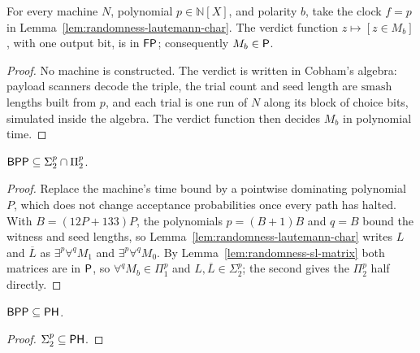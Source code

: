 \begin{lemma}
  \label{lem:randomness-sl-matrix}
  \leanok
  For every machine $N$, polynomial $p \in \mathbb{N}[X]$, and polarity $b$, take
  the clock $f = p$ in Lemma~\ref{lem:randomness-lautemann-char}. The verdict
  function $z \mapsto [z \in M_b]$, with one output bit, is in $\mathsf{FP}$;
  consequently $M_b \in \mathsf{P}$.
\end{lemma}
\begin{proof}
  \leanok
  No machine is constructed. The verdict is written in Cobham's algebra: payload
  scanners decode the triple, the trial count and seed length are
  $\mathrm{smash}$ lengths built from $p$, and each trial is one run of $N$
  along its block of choice bits, simulated inside the algebra. The verdict
  function then decides $M_b$ in polynomial time.
\end{proof}

\begin{theorem}
  \label{thm:randomness-sipser-lautemann}
  \leanok
  $\mathsf{BPP} \subseteq \Sigma^p_2 \cap \Pi^p_2$.
\end{theorem}
\begin{proof}
  \leanok
  Replace the machine's time bound by a pointwise dominating polynomial $P$,
  which does not change acceptance probabilities once every path has halted.
  With $B = (12P + 133)P$, the polynomials $p = (B + 1)B$ and $q = B$ bound
  the witness and seed lengths, so
  Lemma~\ref{lem:randomness-lautemann-char} writes $L$ and $\overline{L}$ as
  $\exists^p \forall^q M_1$ and $\exists^p \forall^q M_0$. By
  Lemma~\ref{lem:randomness-sl-matrix} both matrices are in $\mathsf{P}$, so
  $\forall^q M_b \in \Pi^p_1$ and $L, \overline{L} \in \Sigma^p_2$; the second
  gives the $\Pi^p_2$ half directly.
\end{proof}

\begin{corollary}
  \label{cor:randomness-bpp-ph}
  \leanok
  $\mathsf{BPP} \subseteq \mathsf{PH}$.
\end{corollary}
\begin{proof}
  \leanok
  $\Sigma^p_2 \subseteq \mathsf{PH}$.
\end{proof}

